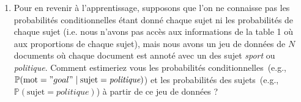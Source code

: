 \documentclass[11pt,french,english]{article}
\begin{document}
\begin{enumerate}
\begin{enumerate}
\item {} {Pour en revenir à l'apprentissage, supposons que l'on ne connaisse pas les probabilités conditionnelles étant donné chaque sujet ni les probabilités de chaque sujet (i.e. nous n'avons pas accès aux informations de la table 1 où aux proportions de chaque sujet), mais nous avons un jeu de données de $N$ documents où chaque document est annoté avec un des sujet \textit{sport} ou \textit{politique}.
Comment estimeriez vous les probabilités conditionnelles~(e.g., $\mathbb{P}(\mathrm{mot} = "goal" \mid \mathrm{sujet}=\textit{politique})$) et les probabilités des sujets~(e.g., $\mathbb{P}(\mathrm{sujet}=\textit{politique})$) à partir de ce jeu de données ?} \\

\end{enumerate}


\end{enumerate}
\end{document}
